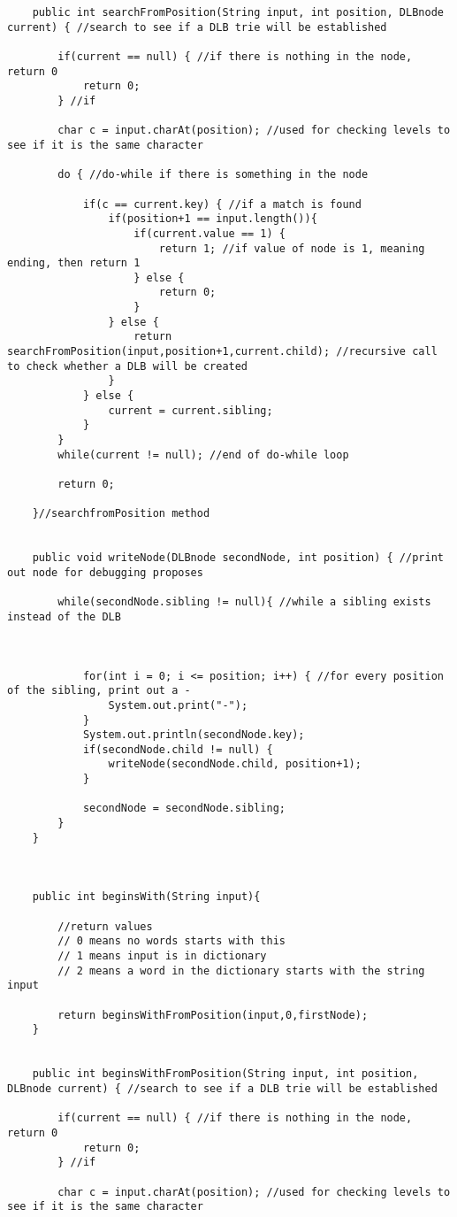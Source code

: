 \documentclass{article}
\begin{document}
\begin{lstlisting}
	public int searchFromPosition(String input, int position, DLBnode current) { //search to see if a DLB trie will be established

		if(current == null) { //if there is nothing in the node, return 0
			return 0;
		} //if

		char c = input.charAt(position); //used for checking levels to see if it is the same character

		do { //do-while if there is something in the node

			if(c == current.key) { //if a match is found
				if(position+1 == input.length()){
					if(current.value == 1) {
						return 1; //if value of node is 1, meaning ending, then return 1 
					} else {
						return 0;
					}
				} else {
					return searchFromPosition(input,position+1,current.child); //recursive call to check whether a DLB will be created
				}
			} else {
				current = current.sibling;
			}
		}
		while(current != null); //end of do-while loop

		return 0; 

	}//searchfromPosition method


	public void writeNode(DLBnode secondNode, int position) { //print out node for debugging proposes

		while(secondNode.sibling != null){ //while a sibling exists instead of the DLB



			for(int i = 0; i <= position; i++) { //for every position of the sibling, print out a -
				System.out.print("-");
			}
			System.out.println(secondNode.key);
			if(secondNode.child != null) {
				writeNode(secondNode.child, position+1);
			}

			secondNode = secondNode.sibling;
		}
	}
	
	
	
	public int beginsWith(String input){
		
		//return values
		// 0 means no words starts with this
		// 1 means input is in dictionary
		// 2 means a word in the dictionary starts with the string input
		
		return beginsWithFromPosition(input,0,firstNode);
	}
	
	
	public int beginsWithFromPosition(String input, int position, DLBnode current) { //search to see if a DLB trie will be established

		if(current == null) { //if there is nothing in the node, return 0
			return 0;
		} //if

		char c = input.charAt(position); //used for checking levels to see if it is the same character


\end{lstlisting}
\end{document}
